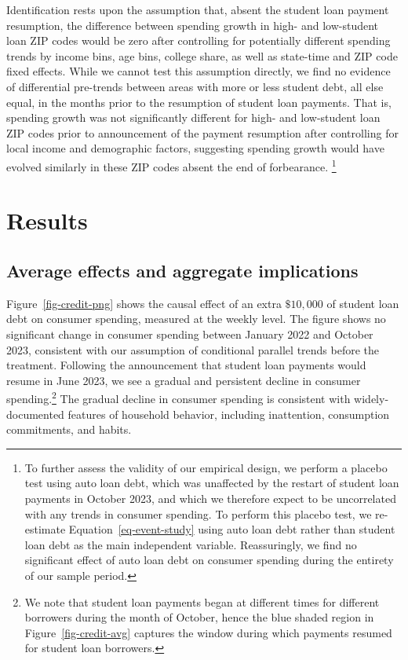\documentclass[
  letterpaper,
  DIV=11,
  numbers=noendperiod]{scrartcl}
\begin{document}
Identification rests upon the assumption that, absent the student loan
payment resumption, the difference between spending growth in high- and
low-student loan ZIP codes would be zero after controlling for
potentially different spending trends by income bins, age bins, college
share, as well as state-time and ZIP code fixed effects. While we cannot
test this assumption directly, we find no evidence of differential
pre-trends between areas with more or less student debt, all else equal,
in the months prior to the resumption of student loan payments. That is,
spending growth was not significantly different for high- and
low-student loan ZIP codes prior to announcement of the payment
resumption after controlling for local income and demographic factors,
suggesting spending growth would have evolved similarly in these ZIP
codes absent the end of forbearance. \footnote{To further assess the
  validity of our empirical design, we perform a placebo test using auto
  loan debt, which was unaffected by the restart of student loan
  payments in October 2023, and which we therefore expect to be
  uncorrelated with any trends in consumer spending. To perform this
  placebo test, we re-estimate Equation~\ref{eq-event-study} using auto
  loan debt rather than student loan debt as the main independent
  variable. Reassuringly, we find no significant effect of auto loan
  debt on consumer spending during the entirety of our sample period.}

\section{Results}\label{results}

\subsection{Average effects and aggregate
implications}\label{average-effects-and-aggregate-implications}

Figure~\ref{fig-credit-png} shows the causal effect of an extra
\(\$10,000\) of student loan debt on consumer spending, measured at the
weekly level. The figure shows no significant change in consumer
spending between January 2022 and October 2023, consistent with our
assumption of conditional parallel trends before the treatment.
Following the announcement that student loan payments would resume in
June 2023, we see a gradual and persistent decline in consumer
spending.\footnote{We note that student loan payments began at different
  times for different borrowers during the month of October, hence the
  blue shaded region in Figure~\ref{fig-credit-avg} captures the window
  during which payments resumed for student loan borrowers.} The gradual
decline in consumer spending is consistent with widely-documented
features of household behavior, including inattention, consumption
commitments, and habits.
\end{document}
